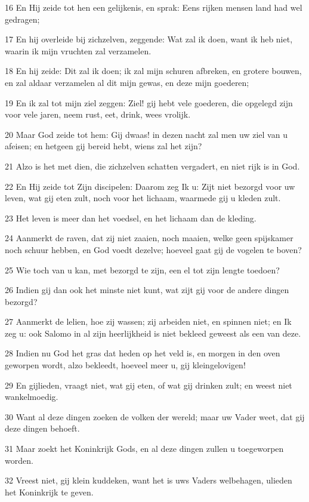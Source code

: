 \par 16 En Hij zeide tot hen een gelijkenis, en sprak: Eens rijken mensen land had wel gedragen;
\par 17 En hij overleide bij zichzelven, zeggende: Wat zal ik doen, want ik heb niet, waarin ik mijn vruchten zal verzamelen.
\par 18 En hij zeide: Dit zal ik doen; ik zal mijn schuren afbreken, en grotere bouwen, en zal aldaar verzamelen al dit mijn gewas, en deze mijn goederen;
\par 19 En ik zal tot mijn ziel zeggen: Ziel! gij hebt vele goederen, die opgelegd zijn voor vele jaren, neem rust, eet, drink, wees vrolijk.
\par 20 Maar God zeide tot hem: Gij dwaas! in dezen nacht zal men uw ziel van u afeisen; en hetgeen gij bereid hebt, wiens zal het zijn?
\par 21 Alzo is het met dien, die zichzelven schatten vergadert, en niet rijk is in God.
\par 22 En Hij zeide tot Zijn discipelen: Daarom zeg Ik u: Zijt niet bezorgd voor uw leven, wat gij eten zult, noch voor het lichaam, waarmede gij u kleden zult.
\par 23 Het leven is meer dan het voedsel, en het lichaam dan de kleding.
\par 24 Aanmerkt de raven, dat zij niet zaaien, noch maaien, welke geen spijskamer noch schuur hebben, en God voedt dezelve; hoeveel gaat gij de vogelen te boven?
\par 25 Wie toch van u kan, met bezorgd te zijn, een el tot zijn lengte toedoen?
\par 26 Indien gij dan ook het minste niet kunt, wat zijt gij voor de andere dingen bezorgd?
\par 27 Aanmerkt de lelien, hoe zij wassen; zij arbeiden niet, en spinnen niet; en Ik zeg u: ook Salomo in al zijn heerlijkheid is niet bekleed geweest als een van deze.
\par 28 Indien nu God het gras dat heden op het veld is, en morgen in den oven geworpen wordt, alzo bekleedt, hoeveel meer u, gij kleingelovigen!
\par 29 En gijlieden, vraagt niet, wat gij eten, of wat gij drinken zult; en weest niet wankelmoedig.
\par 30 Want al deze dingen zoeken de volken der wereld; maar uw Vader weet, dat gij deze dingen behoeft.
\par 31 Maar zoekt het Koninkrijk Gods, en al deze dingen zullen u toegeworpen worden.
\par 32 Vreest niet, gij klein kuddeken, want het is uws Vaders welbehagen, ulieden het Koninkrijk te geven.
